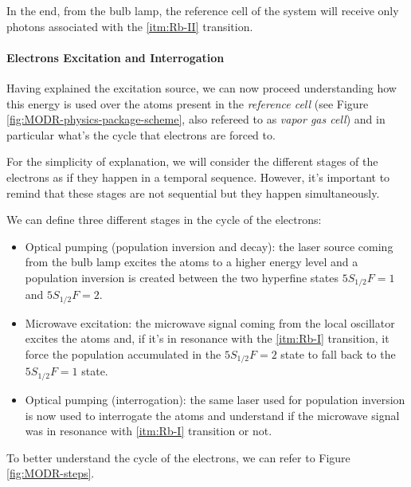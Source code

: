 In the end, from the bulb lamp, the reference cell of the system will receive only photons associated with the \ref{itm:Rb-II} transition.


\paragraph{Electrons Excitation and Interrogation}

Having explained the excitation source, we can now proceed understanding how this energy is used over the atoms present in the \textit{reference cell} (see Figure \ref{fig:MODR-physics-package-scheme}, also refereed to as \textit{vapor gas cell}) and in particular what's the cycle that electrons are forced to.

For the simplicity of explanation, we will consider the different stages of the electrons as if they happen in a temporal sequence.
However, it's important to remind that these stages are not sequential but they happen simultaneously.

We can define three different stages in the cycle of the electrons:

\begin{itemize}
    \item Optical pumping (population inversion and decay): the laser source coming from the bulb lamp excites the atoms to a higher energy level and a population inversion is created between the two hyperfine states $5S_{1/2} F=1$ and $5S_{1/2} F=2$.
    \item Microwave excitation: the microwave signal coming from the local oscillator excites the atoms and, if it's in resonance with the \ref{itm:Rb-I} transition, it force the population accumulated in the $5S_{1/2} F=2$ state to fall back to the $5S_{1/2} F=1$ state.
    \item Optical pumping (interrogation): the same laser used for population inversion is now used to interrogate the atoms and understand if the microwave signal was in resonance with \ref{itm:Rb-I} transition or not.
\end{itemize}

To better understand the cycle of the electrons, we can refer to Figure \ref{fig:MODR-steps}.

